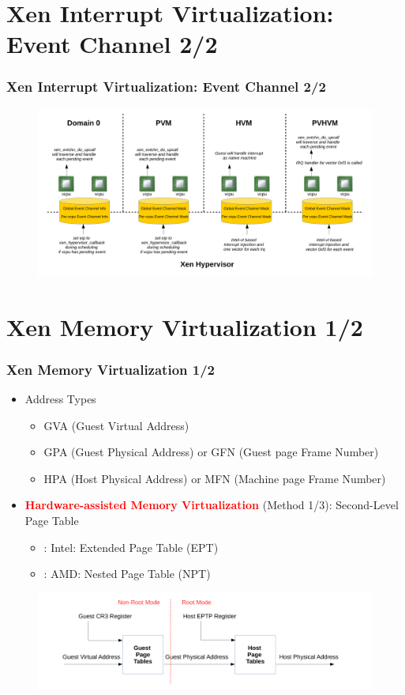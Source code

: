 \documentclass[aspectratio=169]{beamer}
\begin{document}

\section{Xen Interrupt Virtualization: Event Channel 2/2}
\begin{frame}
\frametitle{Xen Interrupt Virtualization: Event Channel 2/2}
\begin{figure}
\includegraphics[width=1.0\linewidth]{figures/evtchn.pdf}
\end{figure}
\end{frame}


\section{Xen Memory Virtualization 1/2}
\begin{frame}
\frametitle{Xen Memory Virtualization 1/2}
\begin{itemize}
\item Address Types
	\begin{itemize}
		\item GVA (Guest Virtual Address)
		\item GPA (Guest Physical Address) or GFN (Guest page Frame Number)
		\item HPA (Host Physical Address) or MFN (Machine page Frame Number)
	\end{itemize}
\item \textbf{\textcolor{red}{Hardware-assisted Memory Virtualization}} (Method 1/3): Second-Level Page Table
	\begin{itemize}
		\item: Intel: Extended Page Table (EPT)
		\item: AMD: Nested Page Table (NPT)
	\end{itemize}
\end{itemize}
\begin{figure}
\includegraphics[width=1.0\linewidth]{figures/ept.pdf}
\end{figure}
\end{frame}
\end{document}
